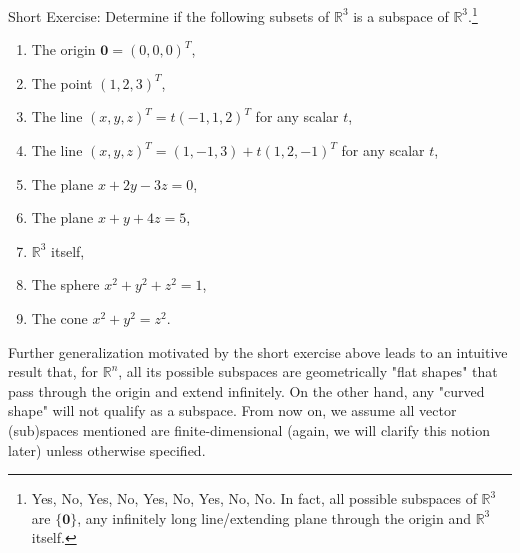 Short Exercise: Determine if the following subsets of $\mathbb{R}^3$ is a subspace of $\mathbb{R}^3$.\footnote{Yes, No, Yes, No, Yes, No, Yes, No, No. In fact, all possible subspaces of $\mathbb{R}^3$ are $\{\textbf{0}\}$, any infinitely long line/extending plane through the origin and $\mathbb{R}^3$ itself.}
\begin{enumerate}[label=(\alph*)]
\item The origin $\textbf{0} = (0,0,0)^T$,
\item The point $(1,2,3)^T$,
\item The line $(x,y,z)^T = t(-1, 1, 2)^T$ for any scalar $t$,
\item The line $(x,y,z)^T = (1, -1, 3) + t(1, 2, -1)^T$ for any scalar $t$,
\item The plane $x + 2y - 3z = 0$,
\item The plane $x + y + 4z = 5$,
\item $\mathbb{R}^3$ itself,
\item The sphere $x^2 + y^2 + z^2 = 1$,
\item The cone $x^2 + y^2 = z^2$.
\end{enumerate}
Further generalization motivated by the short exercise above leads to an intuitive result that, for $\mathbb{R}^n$, all its possible subspaces are geometrically "flat shapes" that pass through the origin and extend infinitely. On the other hand, any "curved shape" will not qualify as a subspace. From now on, we assume all vector (sub)spaces mentioned are finite-dimensional (again, we will clarify this notion later) unless otherwise specified.

